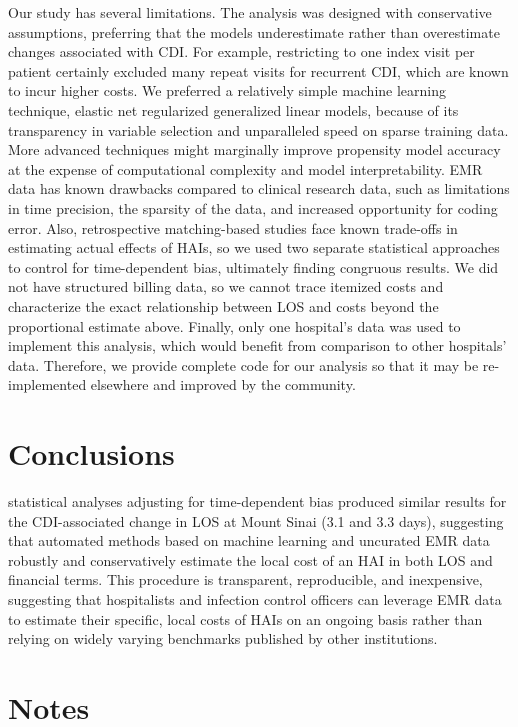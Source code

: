 Our study has several limitations. The analysis was designed with conservative assumptions, preferring that the models underestimate rather than overestimate changes associated with CDI. For example, restricting to one index visit per patient certainly excluded many repeat visits for recurrent CDI, which are known to incur higher costs.\autocite{Dubberke2008,Dubberke2014,Rodrigues2016} We preferred a relatively simple machine learning technique, elastic net regularized generalized linear models, because of its transparency in variable selection and unparalleled speed on sparse training data. More advanced techniques might marginally improve propensity model accuracy at the expense of computational complexity and model interpretability. EMR data has known drawbacks compared to clinical research data, such as limitations in time precision, the sparsity of the data, and increased opportunity for coding error. Also, retrospective matching-based studies face known trade-offs in estimating actual effects of HAIs,\autocite{Graves2010} so we used two separate statistical approaches to control for time-dependent bias, ultimately finding congruous results. We did not have structured billing data, so we cannot trace itemized costs and characterize the exact relationship between LOS and costs beyond the proportional estimate above. Finally, only one hospital’s data was used to implement this analysis, which would benefit from comparison to other hospitals’ data. Therefore, we provide complete code for our analysis so that it may be re-implemented elsewhere and improved by the community.

\section{Conclusions}

 statistical analyses adjusting for time-dependent bias produced similar results for the CDI-associated change in LOS at Mount Sinai (3.1 and 3.3 days), suggesting that automated methods based on machine learning and uncurated EMR data robustly and conservatively estimate the local cost of an HAI in both LOS and financial terms. This procedure is transparent, reproducible, and inexpensive, suggesting that hospitalists and infection control officers can leverage EMR data to estimate their specific, local costs of HAIs on an ongoing basis rather than relying on widely varying benchmarks published by other institutions.

\section*{Notes}

